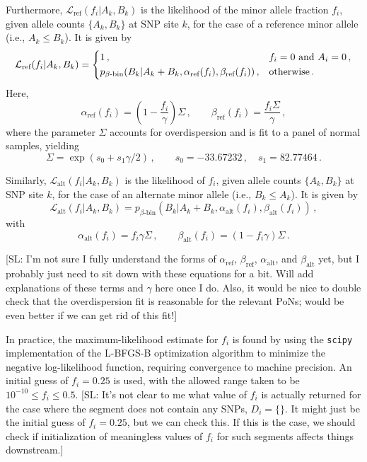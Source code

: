 \documentclass[nofootinbib,amssymb,amsmath]{revtex4}
\def\SL#1{{\color [rgb]{0,0,0.8} [SL: #1]}}
\begin{document}
Furthermore, $\mathcal{L}_\text{ref}(f_i | A_k, B_k)$ is the likelihood of the minor allele fraction $f_i$, given allele counts $\{A_k, B_k\}$ at SNP site $k$, for the case of a reference minor allele (i.e., $A_k \leq B_k$).  It is given by
\begin{equation}
\mathcal{L}_\text{ref}(f_i | A_k, B_k) =
\begin{dcases}
1\,, & f_i = 0~\text{and}~A_i = 0\,, \\
p_{\beta\text{-bin}}(B_k | A_k+B_k, \alpha_\text{ref}(f_i), \beta_\text{ref}(f_i))\,, & \text{otherwise}\,.
\end{dcases}
\end{equation}
Here,
\begin{equation}
\alpha_\text{ref}(f_i) = \left(1 - \frac{f_i}{\gamma}\right) \Sigma\,, \qquad
\beta_\text{ref}(f_i) = \frac{f_i\Sigma}{\gamma}\,,
\end{equation}
where the parameter $\Sigma$ accounts for overdispersion and is fit to a panel of normal samples, yielding
\begin{equation}
\Sigma = \exp(s_0 + s_1\gamma/2)\,, \qquad
s_0 = -33.67232\,,\quad
s_1 = 82.77464\,.
\end{equation}

Similarly, $\mathcal{L}_\text{alt}(f_i | A_k, B_k)$ is the likelihood of $f_i$, given allele counts $\{A_k, B_k\}$ at SNP site $k$, for the case of an alternate minor allele (i.e., $B_k \leq A_k$).  It is given by
\begin{equation}
\mathcal{L}_\text{alt}(f_i | A_k, B_k) =
p_{\beta\text{-bin}}(B_k | A_k+B_k, \alpha_\text{alt}(f_i), \beta_\text{alt}(f_i))\,,
\end{equation}
with
\begin{equation}
\alpha_\text{alt}(f_i) = f_i\gamma\Sigma\,, \qquad
\beta_\text{alt}(f_i) = \left(1 - f_i\gamma\right) \Sigma\,.
\end{equation}

\SL{I'm not sure I fully understand the forms of $\alpha_\text{ref}$, $\beta_\text{ref}$, $\alpha_\text{alt}$, and $\beta_\text{alt}$ yet, but I probably just need to sit down with these equations for a bit.  Will add explanations of these terms and $\gamma$ here once I do.  Also, it would be nice to double check that the overdispersion fit is reasonable for the relevant PoNs; would be even better if we can get rid of this fit!}

In practice, the maximum-likelihood estimate for $f_i$ is found by using the \texttt{scipy} implementation of the L-BFGS-B optimization algorithm to minimize the negative log-likelihood function, requiring convergence to machine precision.  An initial guess of $f_i = 0.25$ is used, with the allowed range taken to be $10^{-10} \leq f_i \leq 0.5$.  \SL{It's not clear to me what value of $f_i$ is actually returned for the case where the segment does not contain any SNPs, $D_i= \{\}$.  It might just be the initial guess of $f_i = 0.25$, but we can check this.  If this is the case, we should check if initialization of meaningless values of $f_i$ for such segments affects things downstream.}
\end{document}

